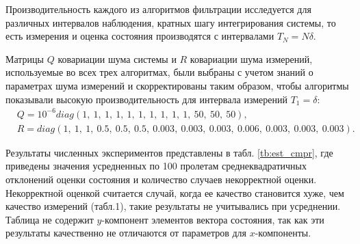 Производительность каждого из алгоритмов фильтрации исследуется для различных интервалов наблюдения,
кратных шагу интегрирования системы,
то есть измерения и оценка состояния производятся с интервалами $T_N = N\delta$.

Матрицы $Q$ ковариации шума системы и $R$ ковариации шума измерений,
используемые во всех трех алгоритмах,
были выбраны с учетом знаний о параметрах шума измерений
и скорректированы таким образом, чтобы алгоритмы показывали
высокую производительность для интервала измерений $T_1 = \delta$:
\begin{equation*} \label{eq:QR}
\begin{aligned}
&Q = 10^{-6} diag(1,\ 1,\ 1,\ 1,\ 1,\ 1,\ 1,\ 1,\ 1,\ 1,\ 50,\ 50,\ 50),\\
&R = diag(1,\ 1,\ 1,\ 0.5,\ 0.5,\ 0.5,\ 0.003,\
0.003,\ 0.003,\ 0.006,\ 0.003,\ 0.003,\ 0.003).
\end{aligned}
\end{equation*}

Результаты численных экспериментов представлены в табл. \ref{tb:est_cmpr},
где приведены значения усредненных по 100 пролетам среднеквадратичных
отклонений оценки состояния
и количество случаев некорректной оценки.
Некорректной оценкой считается случай, когда ее качество становится хуже, чем качество измерений (табл.1),
такие результаты не учитывались при усреднении.
Таблица не содержит $y$-компонент элементов вектора состояния,
так как эти результаты качественно не отличаются от параметров для $x$-компоненты.


